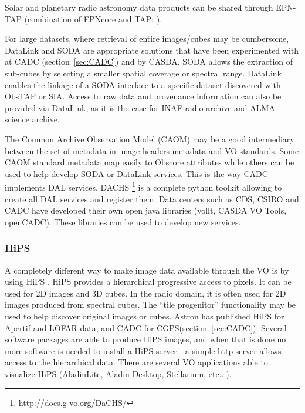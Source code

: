 \documentclass[11pt,a4paper]{ivoa}
\begin{document}
Solar and planetary radio astronomy data products can be shared through EPN-TAP (combination of EPNcore and TAP; \cite{std:EPNTAP}).

For large datasets, where retrieval of entire images/cubes may be cumbersome,  DataLink and SODA are appropriate solutions that have been experimented with at CADC (section~\ref{sec:CADC}) and by CASDA. SODA allows the extraction of sub-cubes by selecting a smaller spatial coverage or spectral range. DataLink enables the linkage of a SODA interface to a specific dataset discovered with ObsTAP or SIA. Access to raw data and provenance information can also be provided via DataLink, as it is the case for INAF radio archive and ALMA science archive.

The Common Archive Observation Model (CAOM) may be a good intermediary between the set of metadata in image headers metadata and VO standards. Some CAOM standard metadata map easily to Obscore attributes while others can be used to help develop SODA or DataLink services. This is the way CADC implements DAL services. DACHS \footnote{\url{http://docs.g-vo.org/DaCHS/}} is a complete python toolkit allowing to create all DAL services and register them. Data centers such as CDS, CSIRO and CADC have developed their own open java libraries (vollt, CASDA VO Tools, openCADC). These libraries can be used to develop new services.


\subsubsection{HiPS}
A completely different way to make image data available through the VO is by using HiPS \citep{2017ivoa.spec.0519F}. HiPS provides a hierarchical progressive access to pixels. It can be used for 2D images and 3D cubes. In the radio domain, it is often used for 2D images produced from spectral cubes. The ``tile progenitor''  functionality may be used to help discover original images or cubes. Astron has published HiPS for Apertif and LOFAR data, and CADC for CGPS(section~\ref{sec:CADC}). Several software packages are able to produce HiPS images, and when that is done no more software is needed to install a HiPS server - a simple http server allows access to the hierarchical data. There are several VO applications able to visualize HiPS (AladinLite, Aladin Desktop, Stellarium, etc...). 
\end{document}
